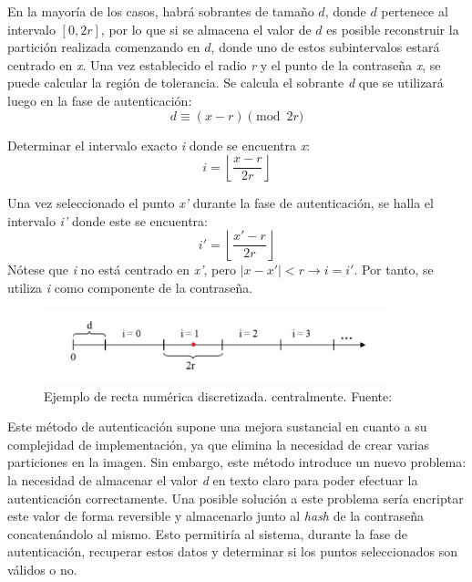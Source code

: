En la mayoría de los casos, habrá sobrantes de tamaño \(d\), donde \(d\) pertenece al intervalo $[0, 2r]$, por lo que si se almacena el valor de \(d\) es posible reconstruir la partición realizada comenzando en \(d\), donde uno de estos subintervalos estará centrado en \textit{x}. Una vez establecido el radio \textit{r} y el punto de la contraseña \textit{x}, se puede calcular la región de tolerancia. Se calcula el sobrante \textit{d} que se utilizará luego en la fase de autenticación:
\begin{equation}
	d \equiv (x - r) \pmod{2r} \label{eq:sobrante}
\end{equation}

Determinar el intervalo exacto \textit{i} donde se encuentra \textit{x}:
\begin{equation}
	i = \left\lfloor \frac{x - r}{2r} \right\rfloor \label{eq:intervalo_registro}
\end{equation}

Una vez seleccionado el punto \textit{x'} durante la fase de autenticación, se halla el intervalo \textit{i'} donde este se encuentra:
\begin{equation}
	i' = \left\lfloor \frac{x' - r}{2r} \right\rfloor \label{eq:intervalo_autenticacion}
\end{equation}
Nótese que \textit{i} no está centrado en \textit{x'}, pero \(|x - x'| < r \rightarrow i = i'\). Por tanto, se utiliza \textit{i} como componente de la contraseña.

	\begin{figure}[H]
		\centering
		\includegraphics[width=0.9\textwidth]{image5.png}	
		\caption{Ejemplo de recta num\'erica discretizada. centralmente. Fuente: \cite{bicakci2008optimal}}	
	\end{figure}

Este método de autenticación supone una mejora sustancial en cuanto a su complejidad de implementación, ya que elimina la necesidad de crear varias particiones en la imagen. Sin embargo, este método introduce un nuevo problema: la necesidad de almacenar el valor \textit{d} en texto claro para poder efectuar la autenticación correctamente. Una posible solución a este problema sería encriptar este valor de forma reversible y almacenarlo junto al \textit{hash} de la contraseña concatenándolo al mismo. Esto permitiría al sistema, durante la fase de autenticación, recuperar estos datos y determinar si los puntos seleccionados son válidos o no.


